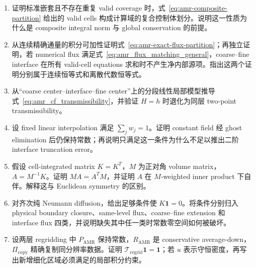 \begin{enumerate}[label=\arabic*.]
\item 证明标准嵌套且不存在重复 valid coverage 时，式~\eqref{eq:amr-composite-partition} 给出的 valid cells 构成计算域的复合控制体划分。说明这一性质为什么是 composite integral norm 与 global conservation 的前提。
\item 从连续精确通量的积分可加性证明式~\eqref{eq:amr-exact-flux-partition}；再独立证明，若 numerical flux 满足式~\eqref{eq:amr_flux_matching_general}，coarse--fine interface 在所有 valid-cell equations 求和时不产生净内部源项。指出这两个证明分别属于连续恒等式和离散代数恒等式。
\item 从“coarse center--interface--fine center”上的分段线性局部模型推导式~\eqref{eq:amr_cf_transmissibility}，并验证 $H=h$ 时退化为同层 two-point transmissibility。
\item 设 fixed linear interpolation 满足 $\sum_jw_j=1$。证明 constant field 经 ghost elimination 后仍保持常数；再说明只满足这一条件为什么不足以推出二阶 interface truncation error。
\item 假设 cell-integrated matrix $K=K^T$，$M$ 为正对角 volume matrix，$A=M^{-1}K$。证明 $MA=A^TM$，并证明 $A$ 在 $M$-weighted inner product 下自伴。解释这与 Euclidean symmetry 的区别。
\item 对齐次纯 Neumann diffusion，给出足够条件使 $K\bm1=0$。将条件分别归入 physical boundary closure、same-level flux、coarse--fine extension 和 interface flux 四类，并说明缺失其中任一类时常数零空间如何被破坏。
\item 设两层 regridding 中 $P_{\mathrm{AMR}}$ 保持常数，$R_{\mathrm{AMR}}$ 是 conservative average-down，$\Pi_{\mathrm{copy}}$ 精确复制同分辨率数据。证明 $\mathcal T_{\mathrm{regrid}}\bm1=\bm1$；若 $u$ 表示守恒密度，再写出新增细化区域必须满足的局部积分约束。
\end{enumerate}

